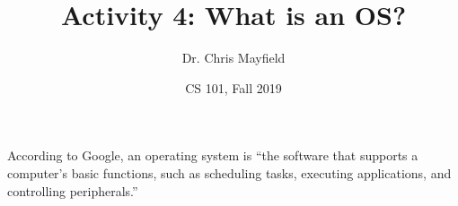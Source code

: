 \documentclass[12pt]{article}
\title{Activity 4: What is an OS?}
\author{Dr. Chris Mayfield}
\date{CS 101, Fall 2019}
\begin{document}
\maketitle

According to Google, an operating system is ``the software that supports a computer's basic functions, such as scheduling tasks, executing applications, and controlling peripherals.''



\end{document}
